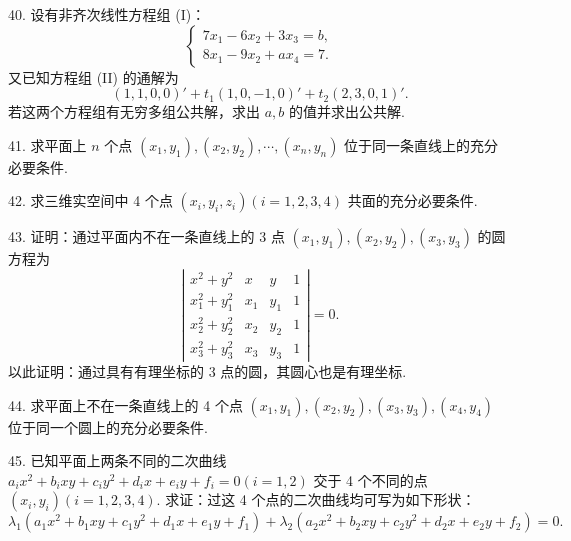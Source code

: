 \documentclass[UTF8,12pt,a4paper,fontset=fandol]{ctexart}
\begin{document}
40. 设有非齐次线性方程组 (I)：
\[
\left\{\begin{array}{r}
7x_1-6x_2+3x_3=b,\\
8x_1-9x_2+ax_4=7.
\end{array}\right.
\]
又已知方程组 (II) 的通解为
\[
(1,1,0,0)'+t_1(1,0,-1,0)'+t_2(2,3,0,1)'.
\]
若这两个方程组有无穷多组公共解，求出 $a,b$ 的值并求出公共解.

41. 求平面上 $n$ 个点 $(x_1,y_1),(x_2,y_2),\cdots,(x_n,y_n)$ 位于同一条直线上的充分必要条件.

42. 求三维实空间中 4 个点 $(x_i,y_i,z_i)(i=1,2,3,4)$ 共面的充分必要条件.

43. 证明：通过平面内不在一条直线上的 3 点 $(x_1,y_1),(x_2,y_2),(x_3,y_3)$ 的圆方程为
\[
\left|\begin{array}{cccc}
x^2+y^2&x&y&1\\
x_1^2+y_1^2&x_1&y_1&1\\
x_2^2+y_2^2&x_2&y_2&1\\
x_3^2+y_3^2&x_3&y_3&1
\end{array}\right|=0.
\]
以此证明：通过具有有理坐标的 3 点的圆，其圆心也是有理坐标.

44. 求平面上不在一条直线上的 4 个点 $(x_1,y_1),(x_2,y_2),(x_3,y_3),(x_4,y_4)$ 位于同一个圆上的充分必要条件.

45. 已知平面上两条不同的二次曲线 $a_ix^2+b_ixy+c_iy^2+d_ix+e_iy+f_i=0(i=1,2)$ 交于 4 个不同的点 $(x_i,y_i)(i=1,2,3,4)$. 求证：过这 4 个点的二次曲线均可写为如下形状：
\[
\lambda_1(a_1x^2+b_1xy+c_1y^2+d_1x+e_1y+f_1)+\lambda_2(a_2x^2+b_2xy+c_2y^2+d_2x+e_2y+f_2)=0.
\]
\end{document}
